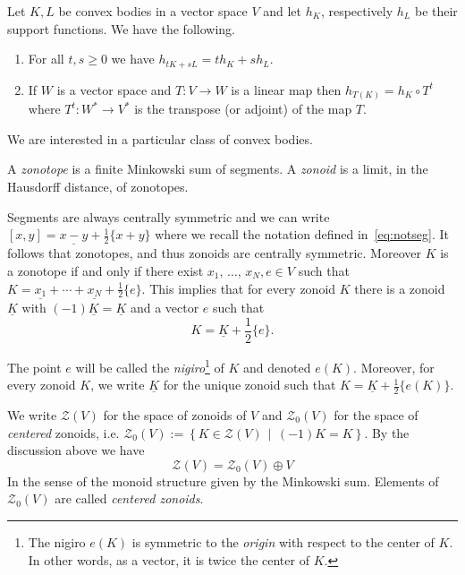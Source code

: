 \documentclass[AHL, Unicode, longabstracts, published]{cedram}
\newcommand{\ZZ}{\mathscr{Z}}
\newcommand{\ZZo}{\mathscr{Z}_0}
\newcommand{\set}[2]{\left\{ #1 \, \middle| \, #2\right\}}
\newcommand{\seg}{\underline}
\begin{document}
\begin{prop}\label{prop:suppfctprop}
Let $K, L$ be convex bodies in a vector space $V$ and let $h_K$, respectively $h_L$ be their support functions. We have the following.
\begin{enumerate}
\item\label{prop3.1.1} For all $t,s\geq0$ we have $h_{tK+sL}=th_K+sh_L$.
\item \label{itm:linh}
If $W$ is a vector space and $T:V\to W$ is a linear map then $h_{T(K)}=h_K\circ T^t$ where $T^t:W^*\to V^*$ is the transpose (or adjoint) of the map $T$.
\end{enumerate}
\end{prop}

We are interested in a particular class of convex bodies.

\begin{defi}
A \emph{zonotope} is a finite Minkowski sum of segments. A \emph{zonoid} is a limit, in the Hausdorff distance, of zonotopes.
\end{defi}

Segments are always centrally symmetric and we can write $[x,y]=\seg{x-y}+\tfrac{1}{2}\{x+y\}$ where we recall the notation defined in~\eqref{eq:notseg}. It follows that zonotopes, and thus zonoids are centrally symmetric. Moreover $K$ is a zonotope if and only if there exist $x_1,\,\ldots,\,x_N,e\in V$ such that $K=\seg{x_1}+\cdots+\seg{x_N}+\tfrac{1}{2}\{e\}$. This implies that for every zonoid $K$ there is a zonoid $\seg{K}$ with $(-1)\seg{K}=\seg{K}$ and a vector $e$ such that
\begin{equation*}
K=\seg{K}+\frac{1}{2}\{e\}.
\end{equation*}

\begin{defi}\label{def:nigiro}
The point $e$ will be called the \emph{nigiro}\footnote{The nigiro $e(K)$ is symmetric to the \emph{origin} with respect to the center of $K$. In other words, as a vector, it is twice the center of $K$.} of $K$ and denoted $e(K)$. Moreover, for every zonoid $K$, we write $\seg{K}$ for the unique zonoid such that $K=\seg{K}+\tfrac{1}{2}\{e(K)\}.$
\end{defi}

We write $\ZZ(V)$ for the space of zonoids of $V$ and $\ZZo(V)$ for the space of \emph{centered} zonoids, i.e. $\ZZo(V):=\set{K\in \ZZ(V)}{(-1)K=K}$. By the discussion above we have
\begin{equation*}
\ZZ(V)=\ZZo(V)\oplus V
\end{equation*}
In the sense of the monoid structure given by the Minkowski sum. Elements of $\ZZo(V)$ are called \emph{centered zonoids}.
\end{document}
